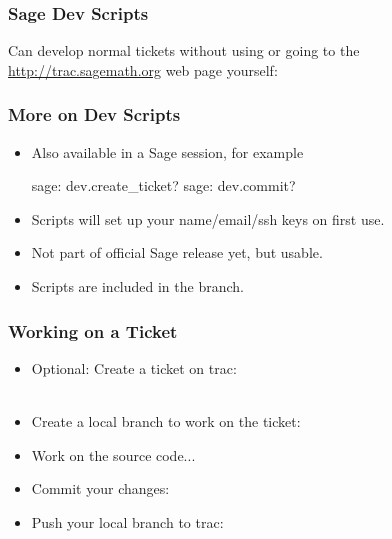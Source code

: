 
\begin{frame}[fragile]
  \frametitle{Sage Dev Scripts}

  Can develop normal tickets without using  or going to the
  \url{http://trac.sagemath.org} web page yourself:

\end{frame}


\begin{frame}[fragile]
  \frametitle{More on Dev Scripts}
  
  \begin{itemize}
  \item<1->
    Also available in a Sage session, for example
    \begin{shell}
      sage: dev.create_ticket?
      sage: dev.commit?
    \end{shell}
  \item<2-> Scripts will set up your name/email/ssh keys on first use.
  \item<3-> Not part of official Sage release yet, but usable.
  \item<4-> Scripts are included in the 
    branch.
  \end{itemize}
  
\end{frame}



\begin{frame}
  \frametitle{Working on a Ticket}
  
  \begin{itemize}
  \item<1-> Optional: Create a ticket on trac:\\
    \\
  \item<2-> Create a local branch to work on the ticket:\\
  \item<3-> Work on the source code...
  \item<4-> Commit your changes:\\
  \item<5-> Push your local branch to trac:\\
  \end{itemize}
\end{frame}



